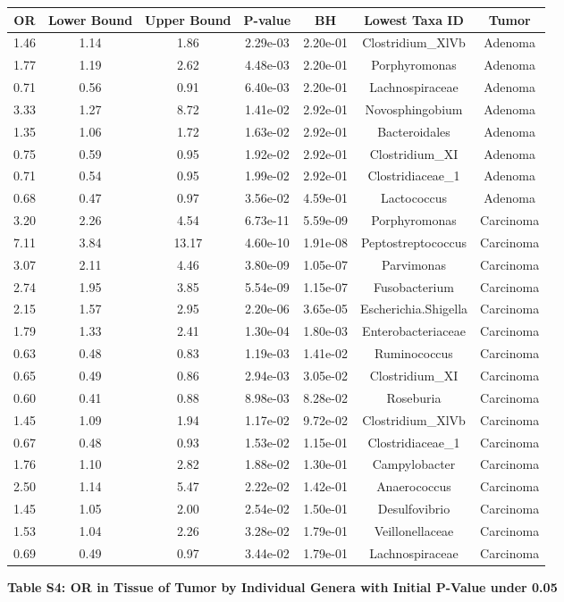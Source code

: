 \documentclass[12pt,]{article}
\begin{document}
\begin{longtable}[]{@{}ccccccc@{}}
\toprule
OR & Lower Bound & Upper Bound & P-value & BH & Lowest Taxa ID &
Tumor\tabularnewline
\midrule
\endhead
1.46 & 1.14 & 1.86 & 2.29e-03 & 2.20e-01 & Clostridium\_XlVb &
Adenoma\tabularnewline
1.77 & 1.19 & 2.62 & 4.48e-03 & 2.20e-01 & Porphyromonas &
Adenoma\tabularnewline
0.71 & 0.56 & 0.91 & 6.40e-03 & 2.20e-01 & Lachnospiraceae &
Adenoma\tabularnewline
3.33 & 1.27 & 8.72 & 1.41e-02 & 2.92e-01 & Novosphingobium &
Adenoma\tabularnewline
1.35 & 1.06 & 1.72 & 1.63e-02 & 2.92e-01 & Bacteroidales &
Adenoma\tabularnewline
0.75 & 0.59 & 0.95 & 1.92e-02 & 2.92e-01 & Clostridium\_XI &
Adenoma\tabularnewline
0.71 & 0.54 & 0.95 & 1.99e-02 & 2.92e-01 & Clostridiaceae\_1 &
Adenoma\tabularnewline
0.68 & 0.47 & 0.97 & 3.56e-02 & 4.59e-01 & Lactococcus &
Adenoma\tabularnewline
3.20 & 2.26 & 4.54 & 6.73e-11 & 5.59e-09 & Porphyromonas &
Carcinoma\tabularnewline
7.11 & 3.84 & 13.17 & 4.60e-10 & 1.91e-08 & Peptostreptococcus &
Carcinoma\tabularnewline
3.07 & 2.11 & 4.46 & 3.80e-09 & 1.05e-07 & Parvimonas &
Carcinoma\tabularnewline
2.74 & 1.95 & 3.85 & 5.54e-09 & 1.15e-07 & Fusobacterium &
Carcinoma\tabularnewline
2.15 & 1.57 & 2.95 & 2.20e-06 & 3.65e-05 & Escherichia.Shigella &
Carcinoma\tabularnewline
1.79 & 1.33 & 2.41 & 1.30e-04 & 1.80e-03 & Enterobacteriaceae &
Carcinoma\tabularnewline
0.63 & 0.48 & 0.83 & 1.19e-03 & 1.41e-02 & Ruminococcus &
Carcinoma\tabularnewline
0.65 & 0.49 & 0.86 & 2.94e-03 & 3.05e-02 & Clostridium\_XI &
Carcinoma\tabularnewline
0.60 & 0.41 & 0.88 & 8.98e-03 & 8.28e-02 & Roseburia &
Carcinoma\tabularnewline
1.45 & 1.09 & 1.94 & 1.17e-02 & 9.72e-02 & Clostridium\_XlVb &
Carcinoma\tabularnewline
0.67 & 0.48 & 0.93 & 1.53e-02 & 1.15e-01 & Clostridiaceae\_1 &
Carcinoma\tabularnewline
1.76 & 1.10 & 2.82 & 1.88e-02 & 1.30e-01 & Campylobacter &
Carcinoma\tabularnewline
2.50 & 1.14 & 5.47 & 2.22e-02 & 1.42e-01 & Anaerococcus &
Carcinoma\tabularnewline
1.45 & 1.05 & 2.00 & 2.54e-02 & 1.50e-01 & Desulfovibrio &
Carcinoma\tabularnewline
1.53 & 1.04 & 2.26 & 3.28e-02 & 1.79e-01 & Veillonellaceae &
Carcinoma\tabularnewline
0.69 & 0.49 & 0.97 & 3.44e-02 & 1.79e-01 & Lachnospiraceae &
Carcinoma\tabularnewline
\bottomrule
\end{longtable}

\normalsize

\newpage

\textbf{Table S4: OR in Tissue of Tumor by Individual Genera with
Initial P-Value under 0.05}

\footnotesize
\end{document}
